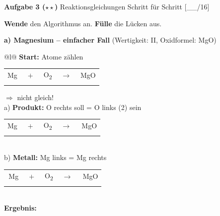 \documentclass[10pt, a4paper]{article}
\newcommand{\luecke}[1]{\underline{\hspace{#1}}}
\newcommand{\punktebox}[1]{\hfill\small\textcolor{mittelgrau}{[\_\_/#1]}}
\newcommand{\aufgabe}[2]{%
    \vspace{6pt}%
    \noindent\textbf{\textcolor{fachfarbe}{Aufgabe #1}} #2%
    \vspace{3pt}%
    \nopagebreak[4]%
}
\newcommand{\operator}[1]{\textbf{\textcolor{fachfarbe}{#1}}}
\begin{document}
\newpage


\aufgabe{3 ($\star\star$)}{Reaktionsgleichungen Schritt für Schritt} \punktebox{16}

\operator{Wende} den Algorithmus an. \operator{Fülle} die Lücken aus.

\small

\textbf{a) Magnesium – einfacher Fall} (Wertigkeit: II, Oxidformel: MgO)

\begin{tabular}{@{}l@{}}
\textbf{Start:} Atome zählen \\[0.3em]
\hspace{1em}\begin{tabular}[t]{@{}c@{}c@{}c@{}c@{}c@{}}
Mg & $\;+\;$ & O\textsubscript{2} & $\;\rightarrow\;$ & MgO \\[-0.2em]
{\scriptsize\luecke{0.4cm}} & & {\scriptsize\luecke{0.4cm}} & & {\scriptsize\luecke{0.4cm}\hspace{0.5em}\luecke{0.4cm}}
\end{tabular} \quad $\Rightarrow$ nicht gleich! \\[0.8em]
%
a) \textbf{Produkt:} O rechts soll = O links (2) sein \\[0.3em]
\hspace{1em}\begin{tabular}[t]{@{}c@{}c@{}c@{}c@{}c@{}}
Mg & $\;+\;$ & O\textsubscript{2} & $\;\rightarrow\;$ & \luecke{0.4cm}\,MgO \\[-0.2em]
{\scriptsize\luecke{0.4cm}} & & {\scriptsize\luecke{0.4cm}} & & {\scriptsize\luecke{0.4cm}\hspace{0.5em}\luecke{0.4cm}}
\end{tabular} \\[0.8em]
%
b) \textbf{Metall:} Mg links = Mg rechts \\[0.3em]
\hspace{1em}\begin{tabular}[t]{@{}c@{}c@{}c@{}c@{}c@{}}
\luecke{0.4cm}\,Mg & $\;+\;$ & O\textsubscript{2} & $\;\rightarrow\;$ & \luecke{0.4cm}\,MgO \\[-0.2em]
{\scriptsize\luecke{0.4cm}} & & {\scriptsize\luecke{0.4cm}} & & {\scriptsize\luecke{0.4cm}\hspace{0.5em}\luecke{0.4cm}}
\end{tabular} \\[0.6em]
%
\textbf{Ergebnis:} \fbox{\luecke{0.4cm} Mg + \luecke{0.4cm} O\textsubscript{2} $\rightarrow$ \luecke{0.4cm} MgO} \\
\end{tabular}
\end{document}
